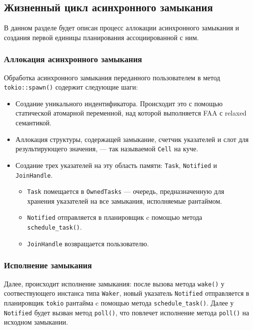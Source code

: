 \subsection{Жизненный цикл асинхронного замыкания}

В данном разделе будет описан процесс аллокации асинхронного замыкания и создания первой единицы планирования ассоциированной с ним.

\subsubsection{Аллокация асинхронного замыкания}

Обработка асинхронного замыкания переданного пользователем в метод \verb|tokio::spawn()| содержит следующие шаги:

\begin{itemize}
    \item Создание уникального индентификатора. Происходит это с помощью статической атомарной переменной, над которой выполняется FAA с relaxed семантикой.
    \item Аллокация структуры, содержащей замыкание, счетчик указателей и слот для результирующего значения, --- так называемой \verb|Cell| на куче.
    \item Создание трех указателей на эту область памяти: \verb|Task|, \verb|Notified| и \verb|JoinHandle|.
    \begin{itemize}
        \item \verb|Task| помещается в \verb|OwnedTasks| --- очередь, предназначенную для хранения указателей на все замыкания, исполняемые рантаймом.
        \item \verb|Notified| отправляется в планировщик c помощью метода \verb|schedule_task()|.
        \item \verb|JoinHandle| возвращается пользователю.
    \end{itemize}
\end{itemize}

\subsubsection{Исполнение замыкания}

Далее, происходит исполнение замыкания: после вызова метода \verb|wake()| у соотвествующего инстанса типа \verb|Waker|, новый указатель \verb|Notified| отправляется в планировщик \verb|tokio| рантайма c помощью метода \verb|schedule_task()|. Далее у \verb|Notified| будет вызван метод \verb|poll()|, что повлечет исполнение метода \verb|poll()| на исходном замыкании.

